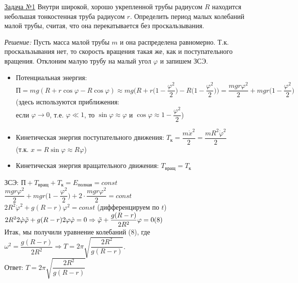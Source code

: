 \documentclass[a4paper,12pt]{article} %
\begin{document}
\begin{wrapfigure}{l}{0.52\textwidth}
	\vspace{-4ex}
	
	\vspace{-10ex}
\end{wrapfigure}

\label{Problems}
\underline{Задача №1} Внутри широкой, хорошо укрепленной трубы радиусом $R$ находится небольшая тонкостенная
труба радиусом $r$. Определить период малых колебаний малой трубы, считая, 
что она перекатывается без проскальзывания.

\pagebreak

\textit{Решение:} Пусть масса малой трубы $m$ и она распределена равномерно.
Т.к. проскальзывания нет, то скорость вращения такая же, как и поступательного
вращения. Отклоним малую трубу на малый угол $\varphi$ и запишем ЗСЭ.
\begin{itemize}
	\item Потенциальная энергия: $П = mg(R+r\cos\varphi-R\cos\varphi) \approx mg \Big(R+r \Big(1-\dfrac{\varphi^2}2\Big)-R\Big(1-\dfrac{\varphi^2}2\Big) \Big) = \dfrac{mgr\varphi^2}2+mgr \Big(1-\dfrac{\varphi^2}2 \Big) $
	(здесь используются приближения: \\ если $\varphi \rightarrow 0$, т.е. $\varphi \ll 1$, то $\sin\varphi \approx \varphi$ и $\cos\varphi \approx 1-\dfrac{\varphi^2}2$)
	\item Кинетическая энергия поступательного движения: $T_к = \dfrac{m \dot x^2}2=\dfrac{mR^2 \dot\varphi^2}2$ \\ (т.к. $x=R\sin\varphi \approx R\varphi$)
	\item Кинетическая энергия вращательного движения: $T_{вращ} = T_к$
\end{itemize} 
ЗСЭ: $П+T_{вращ}+T_{к} = E_{полная} = const$ \\
$\dfrac{mgr\varphi^2}2+mgr \Big(1-\dfrac{\varphi^2}2 \Big) + 2 \cdot \dfrac{mgr\varphi^2}2 = const$ \\
$ 2R^2 \dot\varphi^2 + g (R-r)\varphi^2 = const$ (дифференцируем по $t$) \\
$2R^2 2 \dot\varphi \ddot\varphi + g (R-r) 2\varphi \dot\varphi = 0 \Rightarrow \ddot\varphi + \dfrac{g(R-r)}{2R^2} \varphi = 0 \hfill (8)$ \\
Итак, мы получили уравнение колебаний (8), где $\omega^2=\dfrac{g(R-r)}{2R^2} \Rightarrow T=2\pi\sqrt{\dfrac{2R^2}{g(R-r)}}$. \\
Ответ: $T=2\pi\sqrt{\dfrac{2R^2}{g(R-r)}}$
\end{document}
